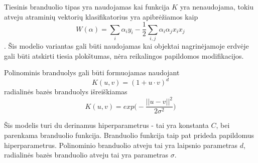 Tiesinis branduolio tipas yra naudojamas kai funkcija $K$ yra nenaudojama, tokiu atveju atraminių vektorių klasifikatorius yra apibrėžiamos kaip
\begin{equation}
    W(\alpha) = \sum_{i}\alpha_i y_i - \frac{1}{2} \sum_{i, j} \alpha_i \alpha_j x_i x_j
\end{equation}.
Šis modelio variantas gali būti naudojamas kai objektai nagrinėjamoje erdvėje gali būti atskirti tiesia plokštumas, nėra reikalingos papildomos modifikacijos.

Polinominis branduolys gali būti formuojamas naudojant \cite{vw}
\begin{equation}
    K(u, v) = (1 + u \cdot v)^d
\end{equation}
radialinės bazės branduolys išreiškiamas
\begin{equation}
    K(u, v) = exp \big( - \frac{|| u - v ||^2}{2 \sigma ^ 2} \big)
\end{equation}

Šis modelis turi du derinamus hiperparametrus - tai yra konstanta $C$, bei parenkama branduolio funkcija. Branduolio funkcija taip pat prideda papildomus hiperparametrus. Polinominio branduolio atveju tai yra laipsnio parametras $d$, radialinės bazės branduolio atveju tai yra parametras $\sigma$.